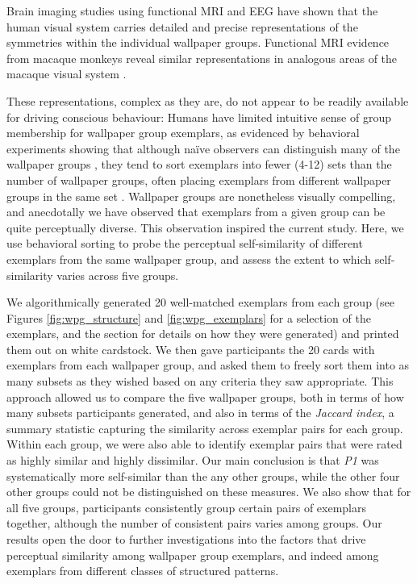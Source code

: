\documentclass[11pt, twoside]{article}
\begin{document}
Brain imaging studies using functional MRI \citep{RN1725} and EEG \citep{RN1959,kohler_clarke_2021} have shown that the human visual system carries detailed and precise representations of the symmetries within the individual wallpaper groups. Functional MRI evidence from macaque monkeys reveal similar representations in analogous areas of the macaque visual system \citep{audurier_symmetry_2021}.

These representations, complex as they are, do not appear to be readily available for driving conscious behaviour: Humans have limited intuitive sense of group membership for wallpaper group exemplars, as evidenced by behavioral experiments showing that although naïve observers can distinguish many of the wallpaper groups \citep{RN1253}, they tend to sort exemplars into fewer (4-12) sets than the number of wallpaper groups, often placing exemplars from different wallpaper groups in the same set \citep{RN172}. Wallpaper groups are nonetheless visually compelling, and anecdotally we have observed that exemplars from a given group can be quite perceptually diverse. This observation inspired the current study. Here, we use behavioral sorting to probe the perceptual self-similarity of different exemplars from the same wallpaper group, and assess the extent to which self-similarity varies across five groups. 

We algorithmically generated 20 well-matched exemplars from each group (see Figures \ref{fig:wpg_structure} and \ref{fig:wpg_exemplars} for a selection of the exemplars, and the  section for details on how they were generated) and printed them out on white cardstock. We then gave participants the 20 cards with exemplars from each wallpaper group, and asked them to freely sort them into as many subsets as they wished based on any criteria they saw appropriate. This approach allowed us to compare the five wallpaper groups, both in terms of how many subsets participants generated, and also in terms of the \textit{Jaccard index}, a summary statistic capturing the similarity across exemplar pairs for each group. Within each group, we were also able to identify exemplar pairs that were rated as highly similar and highly dissimilar. Our main conclusion is that \textit{P1} was systematically more self-similar than the any other groups, while the other four other groups could not be distinguished on these measures. We also show that for all five groups, participants consistently group certain pairs of exemplars together, although the number of consistent pairs varies among groups. Our results open the door to further investigations into the factors that drive perceptual similarity among wallpaper group exemplars, and indeed among exemplars from different classes of structured patterns. 
\end{document}
